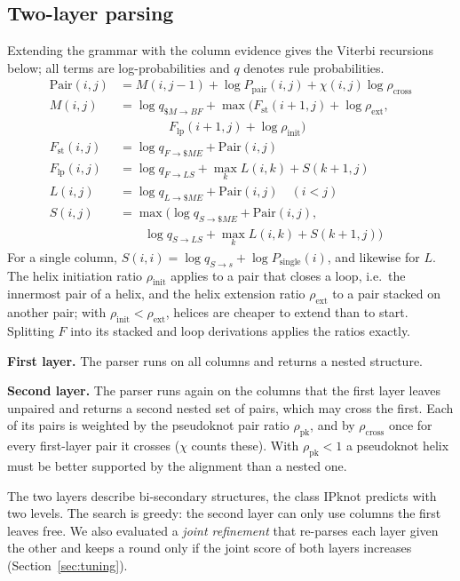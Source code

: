 \documentclass[10pt, twocolumn]{article}
\newcommand{\rinit}{\rho_{\mathrm{init}}}
\newcommand{\rext}{\rho_{\mathrm{ext}}}
\newcommand{\rcross}{\rho_{\mathrm{cross}}}
\newcommand{\rpk}{\rho_{\mathrm{pk}}}
\begin{document}
\subsection{Two-layer parsing}
\label{sec:parser}
Extending the grammar with the column evidence gives the Viterbi recursions below; all terms are log-probabilities and $q$ denotes rule probabilities.
\begin{align*}
\mathrm{Pair}(i,j) &= M(i,j{-}1) + \log P_{\text{pair}}(i,j) + \chi(i,j)\log\rcross\\
M(i,j) &= \log q_{\$M\to BF} + \max\big(F_{\text{st}}(i{+}1,j) + \log\rext,\\
&\qquad\qquad F_{\text{lp}}(i{+}1,j) + \log\rinit\big)\\
F_{\text{st}}(i,j) &= \log q_{F\to \$M E} + \mathrm{Pair}(i,j)\\
F_{\text{lp}}(i,j) &= \log q_{F\to LS} + \max_k L(i,k) + S(k{+}1,j)\\
L(i,j) &= \log q_{L\to \$M E} + \mathrm{Pair}(i,j) \quad (i<j)\\
S(i,j) &= \max\big(\log q_{S\to \$M E} + \mathrm{Pair}(i,j),\\
&\qquad \log q_{S\to LS} + \max_k L(i,k) + S(k{+}1,j)\big)
\end{align*}
For a single column, $S(i,i) = \log q_{S\to s} + \log P_{\text{single}}(i)$, and likewise for $L$. The helix initiation ratio $\rinit$ applies to a pair that closes a loop, i.e.\ the innermost pair of a helix, and the helix extension ratio $\rext$ to a pair stacked on another pair; with $\rinit<\rext$, helices are cheaper to extend than to start. Splitting $F$ into its stacked and loop derivations applies the ratios exactly.

\textbf{First layer.} The parser runs on all columns and returns a nested structure.

\textbf{Second layer.} The parser runs again on the columns that the first layer leaves unpaired and returns a second nested set of pairs, which may cross the first. Each of its pairs is weighted by the pseudoknot pair ratio $\rpk$, and by $\rcross$ once for every first-layer pair it crosses ($\chi$ counts these). With $\rpk<1$ a pseudoknot helix must be better supported by the alignment than a nested one.

The two layers describe bi-secondary structures, the class IPknot predicts with two levels. The search is greedy: the second layer can only use columns the first leaves free. We also evaluated a \emph{joint refinement} that re-parses each layer given the other and keeps a round only if the joint score of both layers increases (Section~\ref{sec:tuning}).
\end{document}

